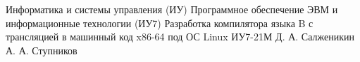 \makecourseworktitle
{Информатика и системы управления (ИУ)}
{Программное обеспечение ЭВМ и информационные технологии (ИУ7)}
{Разработка компилятора языка B с трансляцией в машинный код x86-64 под ОС Linux}
{ИУ7-21М}
{Д. А. Салженикин}
{А. А. Ступников}
{}
{}
